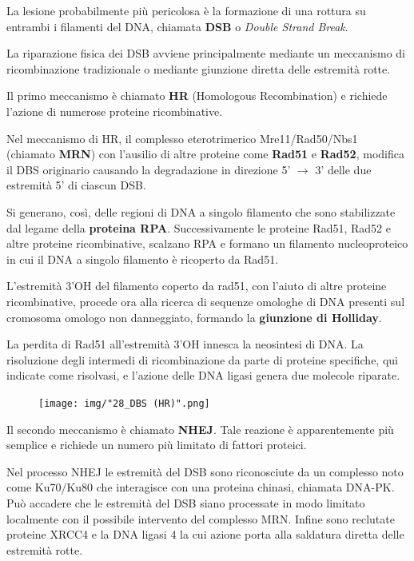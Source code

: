 \documentclass[11pt]{book}
\begin{document}
La lesione probabilmente più pericolosa è la formazione di una rottura
su entrambi i filamenti del DNA, chiamata \textbf{DSB} o \emph{Double
Strand Break}.

La riparazione fisica dei DSB avviene principalmente mediante un
meccanismo di ricombinazione tradizionale o mediante giunzione diretta
delle estremità rotte.

Il primo meccanismo è chiamato \textbf{HR} (Homologous Recombination) e
richiede l'azione di numerose proteine ricombinative.

Nel meccanismo di HR, il complesso eterotrimerico Mre11/Rad50/Nbs1
(chiamato \textbf{MRN}) con l'ausilio di altre proteine come
\textbf{Rad51} e \textbf{Rad52}, modifica il DBS originario causando la
degradazione in direzione 5' \(\rightarrow\) 3' delle due estremità 5'
di ciascun DSB.

Si generano, così, delle regioni di DNA a singolo filamento che sono
stabilizzate dal legame della \textbf{proteina RPA}. Successivamente le
proteine Rad51, Rad52 e altre proteine ricombinative, scalzano RPA e
formano un filamento nucleoproteico in cui il DNA a singolo filamento è
ricoperto da Rad51.

L'estremità 3'OH del filamento coperto da rad51, con l'aiuto di altre
proteine ricombinative, procede ora alla ricerca di sequenze omologhe di
DNA presenti sul cromosoma omologo non danneggiato, formando la
\textbf{giunzione di Holliday}.

La perdita di Rad51 all'estremità 3'OH innesca la neosintesi di DNA. La
risoluzione degli intermedi di ricombinazione da parte di proteine
specifiche, qui indicate come risolvasi, e l'azione delle DNA ligasi
genera due molecole riparate.

\clearpage
\begin{figure}[htp]
\centering
\texttt{[image: img/"28\_DBS (HR)".png]}
\caption{}
\label{dbs-hr}
\end{figure}

Il secondo meccanismo è chiamato \textbf{NHEJ}. Tale reazione è
apparentemente più semplice e richiede un numero più limitato di fattori
proteici.

Nel processo NHEJ le estremità del DSB sono riconosciute da un complesso
noto come Ku70/Ku80 che interagisce con una proteina chinasi, chiamata
DNA-PK. Può accadere che le estremità del DSB siano processate in modo
limitato localmente con il possibile intervento del complesso MRN.
Infine sono reclutate proteine XRCC4 e la DNA ligasi 4 la cui azione
porta alla saldatura diretta delle estremità rotte.
\end{document}
